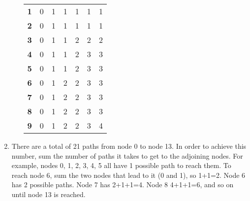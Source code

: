 \documentclass[11pt, letterpaper]{article}
\begin{document}
\begin{enumerate}
\begin{enumerate}
\begin{table}[h]
\begin{tabular}{lllllll}
          \textbf{1} & 0               & 1                & 1                   & 1                      & 1                         & 1                            \\
          \textbf{2} & 0               & 1                & 1                   & 1                      & 1                         & 1                            \\
          \textbf{3} & 0               & 1                & 1                   & 2                      & 2                         & 2                            \\
          \textbf{4} & 0               & 1                & 1                   & 2                      & 3                         & 3                            \\
          \textbf{5} & 0               & 1                & 1                   & 2                      & 3                         & 3                            \\
          \textbf{6} & 0               & 1                & 2                   & 2                      & 3                         & 3                            \\
          \textbf{7} & 0               & 1                & 2                   & 2                      & 3                         & 3                            \\
          \textbf{8} & 0               & 1                & 2                   & 2                      & 3                         & 3                            \\
          \textbf{9} & 0               & 1                & 2                   & 2                      & 3                         & 4
          \end{tabular}
          \end{table}
      \end{enumerate}
      \item
        There are a total of 21 paths from node 0 to node 13. In order to achieve this number, sum the
        number of paths it takes to get to the adjoining nodes. For example, nodes 0, 1, 2, 3, 4, 5 all have
        1 possible path to reach them. To reach node 6, sum the two nodes that lead to it (0 and 1), so 1+1=2.
        Node 6 has 2 possible paths. Node 7 has 2+1+1=4. Node 8 4+1+1=6, and so on until node 13 is reached.
  \end{enumerate}
\end{document}
